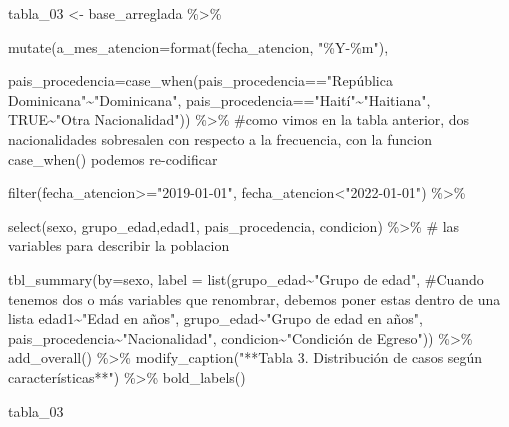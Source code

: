 \documentclass[
  letterpaper,
  DIV=11,
  numbers=noendperiod]{scrreprt}
\newenvironment{Shaded}{\begin{snugshade}}{\end{snugshade}}
\newcommand{\AttributeTok}[1]{\textcolor[rgb]{0.40,0.45,0.13}{#1}}
\newcommand{\CommentTok}[1]{\textcolor[rgb]{0.37,0.37,0.37}{#1}}
\newcommand{\ConstantTok}[1]{\textcolor[rgb]{0.56,0.35,0.01}{#1}}
\newcommand{\FunctionTok}[1]{\textcolor[rgb]{0.28,0.35,0.67}{#1}}
\newcommand{\NormalTok}[1]{\textcolor[rgb]{0.00,0.23,0.31}{#1}}
\newcommand{\OtherTok}[1]{\textcolor[rgb]{0.00,0.23,0.31}{#1}}
\newcommand{\SpecialCharTok}[1]{\textcolor[rgb]{0.37,0.37,0.37}{#1}}
\newcommand{\StringTok}[1]{\textcolor[rgb]{0.13,0.47,0.30}{#1}}
\begin{document}
\begin{Shaded}
\begin{Highlighting}[]
\NormalTok{tabla\_03 }\OtherTok{\textless{}{-}}\NormalTok{ base\_arreglada }\SpecialCharTok{\%\textgreater{}\%} 
  
\FunctionTok{mutate}\NormalTok{(}\AttributeTok{a\_mes\_atencion=}\FunctionTok{format}\NormalTok{(fecha\_atencion, }\StringTok{"\%Y{-}\%m"}\NormalTok{),}
       
       \AttributeTok{pais\_procedencia=}\FunctionTok{case\_when}\NormalTok{(pais\_procedencia}\SpecialCharTok{==}\StringTok{"República Dominicana"}\SpecialCharTok{\textasciitilde{}}\StringTok{"Dominicana"}\NormalTok{,}
\NormalTok{                                  pais\_procedencia}\SpecialCharTok{==}\StringTok{"Haití"}\SpecialCharTok{\textasciitilde{}}\StringTok{"Haitiana"}\NormalTok{,}
                                  \ConstantTok{TRUE}\SpecialCharTok{\textasciitilde{}}\StringTok{"Otra Nacionalidad"}\NormalTok{)) }\SpecialCharTok{\%\textgreater{}\%} \CommentTok{\#como vimos en la tabla anterior, dos nacionalidades sobresalen con respecto a la frecuencia, con la funcion case\_when() podemos re{-}codificar}
 
   \FunctionTok{filter}\NormalTok{(fecha\_atencion}\SpecialCharTok{\textgreater{}=}\StringTok{"2019{-}01{-}01"}\NormalTok{, fecha\_atencion}\SpecialCharTok{\textless{}}\StringTok{"2022{-}01{-}01"}\NormalTok{) }\SpecialCharTok{\%\textgreater{}\%}
  
  
  \FunctionTok{select}\NormalTok{(sexo, grupo\_edad,edad1, pais\_procedencia, condicion) }\SpecialCharTok{\%\textgreater{}\%}  \CommentTok{\# las variables para describir la poblacion}

  \FunctionTok{tbl\_summary}\NormalTok{(}\AttributeTok{by=}\NormalTok{sexo,}
             \AttributeTok{label =} \FunctionTok{list}\NormalTok{(grupo\_edad}\SpecialCharTok{\textasciitilde{}}\StringTok{"Grupo de edad"}\NormalTok{, }\CommentTok{\#Cuando tenemos dos o más variables que renombrar, debemos poner estas dentro de una lista}
\NormalTok{              edad1}\SpecialCharTok{\textasciitilde{}}\StringTok{"Edad en años"}\NormalTok{,}
\NormalTok{              grupo\_edad}\SpecialCharTok{\textasciitilde{}}\StringTok{"Grupo de edad en años"}\NormalTok{,}
\NormalTok{              pais\_procedencia}\SpecialCharTok{\textasciitilde{}}\StringTok{"Nacionalidad"}\NormalTok{,}
\NormalTok{              condicion}\SpecialCharTok{\textasciitilde{}}\StringTok{"Condición de Egreso"}\NormalTok{)) }\SpecialCharTok{\%\textgreater{}\%} 
  \FunctionTok{add\_overall}\NormalTok{() }\SpecialCharTok{\%\textgreater{}\%} 
  \FunctionTok{modify\_caption}\NormalTok{(}\StringTok{"**Tabla 3. Distribución de casos según características**"}\NormalTok{) }\SpecialCharTok{\%\textgreater{}\%} 
  \FunctionTok{bold\_labels}\NormalTok{()}

\NormalTok{tabla\_03}
\end{Highlighting}
\end{Shaded}
\end{document}
